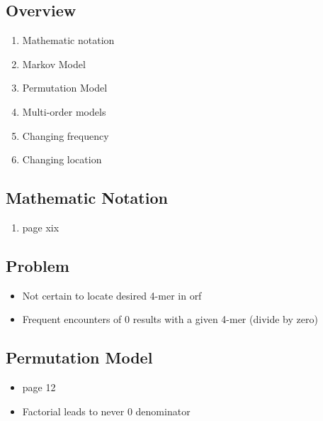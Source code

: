 \documentclass[12pt,notitlepage]{article}
\author{Leo Przybylski}
\begin{document}
  \W \begin{s5presentation}
  \maketitle

\begin{ifhtml}
    \begin{s5slide}
      \section{Overview}
      \begin{enumerate}
        \item Mathematic notation
        \item Markov Model
        \item Permutation Model
        \item Multi-order models
        \item Changing frequency
        \item Changing location
      \end{enumerate}
    \end{s5slide}

    \begin{s5slide}
      \section{Mathematic Notation}
      \begin{enumerate}
        \item page xix
      \end{enumerate}
    \end{s5slide}

    \begin{s5slide}
      \section{Problem}
      \begin{itemize}
        \item Not certain to locate desired 4-mer in orf
        \item Frequent encounters of 0 results with a given 4-mer (divide by zero)
      \end{itemize}
    \end{s5slide}

    \begin{s5slide}
      \section{Permutation Model}
      \begin{itemize}
        \item page 12
        \item Factorial leads to never 0 denominator
      \end{itemize}
    \end{s5slide}


\end{ifhtml}
\end{s5presentation}
\end{document}

